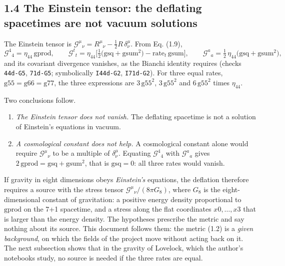 \documentclass[
  10pt,
]{article}
\providecommand{\tightlist}{%
  \setlength{\itemsep}{0pt}\setlength{\parskip}{0pt}}
\begin{document}
\hypertarget{the-einstein-tensor-the-deflating-spacetimes-are-not-vacuum-solutions}{%
\subsection{1.4 The Einstein tensor: the deflating spacetimes are not
vacuum
solutions}\label{the-einstein-tensor-the-deflating-spacetimes-are-not-vacuum-solutions}}

The Einstein tensor is
\(\mathcal G^\mu{}_\nu=R^\mu{}_\nu-\tfrac12R\,\delta^\mu_\nu\). From Eq.
(1.9), \[\mathcal G^4{}_4=\eta_{44}\,\mathrm{gprod},\qquad
\mathcal G^t{}_t=\eta_{44}\Big[\tfrac12\big(\mathrm{gsq}+\mathrm{gsum}^2\big)-\mathrm{rate}_t\,\mathrm{gsum}\Big],\qquad
\mathcal G^a{}_a=\tfrac12\,\eta_{44}\big(\mathrm{gsq}+\mathrm{gsum}^2\big),\tag{1.10}\]
and its covariant divergence vanishes, as the Bianchi identity requires
(checks \texttt{44d-G5}, \texttt{71d-G5}; symbolically \texttt{I44d-G2},
\texttt{I71d-G2}). For three equal rates,
\(\mathrm{g55}=\mathrm{g66}=\mathrm{g77}\), the three expressions are
\(3\,\mathrm{g55}^2\), \(3\,\mathrm{g55}^2\) and \(6\,\mathrm{g55}^2\)
times \(\eta_{44}\).

Two conclusions follow.

\begin{enumerate}
\def\labelenumi{\arabic{enumi}.}
\tightlist
\item
  \emph{The Einstein tensor does not vanish.} The deflating spacetime is
  not a solution of Einstein's equations in vacuum.
\item
  \emph{A cosmological constant does not help.} A cosmological constant
  alone would require \(\mathcal G^\mu{}_\nu\) to be a multiple of
  \(\delta^\mu_\nu\). Equating \(\mathcal G^4{}_4\) with
  \(\mathcal G^a{}_a\) gives
  \(2\,\mathrm{gprod}=\mathrm{gsq}+\mathrm{gsum}^2\), that is
  \(\mathrm{gsq}=0\): all three rates would vanish.
\end{enumerate}

If gravity in eight dimensions obeys \emph{Einstein's} equations, the
deflation therefore requires a source with the stress tensor
\(\mathcal G^\mu{}_\nu/(8\pi G_8)\), where \(G_8\) is the
eight-dimensional constant of gravitation: a positive energy density
proportional to \(\mathrm{gprod}\) on the 7+1 spacetime, and a stress
along the flat coordinates \(x0,\dots,x3\) that is larger than the
energy density. The hypotheses prescribe the metric and say nothing
about its source. This document follows them: the metric (1.2) is a
\emph{given background}, on which the fields of the project move without
acting back on it. The next subsection shows that in the gravity of
Lovelock, which the author's notebooks study, no source is needed if the
three rates are equal.
\end{document}
